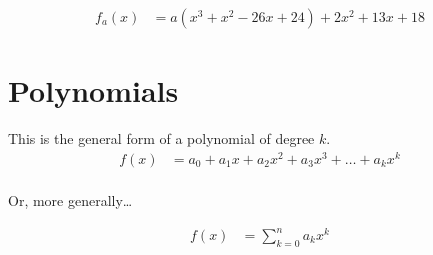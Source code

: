 \documentclass[preview,border=3mm]{article}
\begin{document}
\begin{align}
    f_a(x) &= a(x^3 + x^2 -26x + 24) + 2x^2 + 13x + 18 \label{eq19}
\end{align}


\section{Polynomials}
\noindent
This is the general form of a polynomial of degree $k$.
\begin{align*}
    f(x) &= a_0 + a_1x + a_2x^2 + a_3x^3 + \ldots + a_kx^k\\
\end{align*}

\noindent
Or, more generally\dots

\begin{align*}
    f(x) &= \sum\limits_{k=0}^n a_kx^k
\end{align*}
\end{document}
